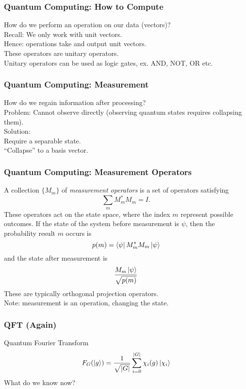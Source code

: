 \documentclass{beamer}
\renewcommand{\bra}{\Bra}
\renewcommand{\ket}{\Ket}
\newcommand{\abs}[1]{\left\lvert #1 \right\rvert}
\begin{document}
\begin{frame}
\frametitle{Quantum Computing: How to Compute}
        How do we perform an operation on our data (vectors)?\\\pause
        Recall: We only work with unit vectors.\\\pause
        Hence: operations take and output unit vectors.\\\pause
        These operators are unitary operators.\\\pause
        Unitary operators can be used as logic gates, ex. AND, NOT, OR etc.
\end{frame}

\begin{frame}
\frametitle{Quantum Computing: Measurement}
        How do we regain information after processing?\\\pause
        Problem: \pause Cannot observe directly (observing quantum states requires collapsing them).\\\pause
        Solution:\\\pause 
        Require a separable state.\\\pause
        ``Collapse'' to a basis vector.
\end{frame}

\begin{frame}
\frametitle{Quantum Computing: Measurement Operators}
    \begin{definition}\label{def:measurement_operator}
            A collection $\{M_m\}$ of \textit{measurement operators} is a set of operators satisfying $$\sum_m M_m^* M_m = I.$$ 
            These operators act on the state space, where the index $m$ represent possible outcomes. 
            If the state of the system before measurement is $\psi$, then the probability result $m$ occurs is $$p(m) = \bra{\psi}M_m^* M_m \ket{\psi}$$ and the state after measurement is $$\frac{M_m \ket{\psi}}{\sqrt{p(m)}}$$
            These are typically orthogonal projection operators.\\
            Note: measurement is an operation, changing the state.
        \end{definition}
\end{frame}

\begin{frame}
\frametitle{QFT (Again)}
        Quantum Fourier Transform
        $$ F_G(\ket{g}) = \frac{1}{\sqrt{\abs{G}}} \sum_{i=0}^{\abs{G}} \chi_i(g) \ket{\chi_i}$$
        What do we know now?
\end{frame}
\end{document}

